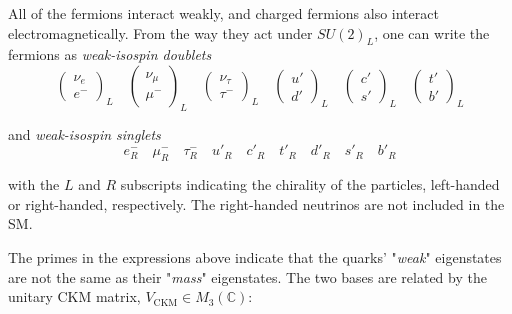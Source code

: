     All of the fermions interact weakly, and charged fermions also interact electromagnetically.
    From the way they act under $SU(2)_L$, one can write the fermions as \textit{weak-isospin doublets}
    \begin{equation*}
        \begin{pmatrix}
            \nu_e \\
            e^-
        \end{pmatrix}_L
        \quad
        \begin{pmatrix}
            \nu_\mu \\
            \mu^-
        \end{pmatrix}_L
        \quad
        \begin{pmatrix}
            \nu_\tau \\
            \tau^-
        \end{pmatrix}_L
        \quad
        \begin{pmatrix}
            u' \\
            d'
        \end{pmatrix}_L
        \quad
        \begin{pmatrix}
            c' \\
            s'
        \end{pmatrix}_L
        \quad
        \begin{pmatrix}
            t' \\
            b'
        \end{pmatrix}_L
    \end{equation*}

    and \textit{weak-isospin singlets}
    \begin{equation*}
        e^-_R
        \quad
        \mu^-_R
        \quad
        \tau^-_R
        \quad
        u'_R
        \quad
        c'_R
        \quad
        t'_R
        \quad
        d'_R
        \quad
        s'_R
        \quad
        b'_R
    \end{equation*}

with the $L$ and $R$ subscripts indicating the chirality of the particles, left-handed or right-handed, respectively.
The right-handed neutrinos are not included in the \gls{SM}.

The primes in the expressions above indicate that the quarks' "\textit{weak}" eigenstates are not the same as their "\textit{mass}" eigenstates. 
The two bases are related by the unitary \gls{CKM} matrix, $V_{\text{CKM}} \in M_3\left(\mathbb{C}\right)$:

